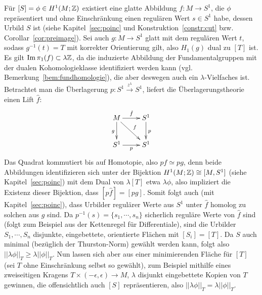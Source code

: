 			Für $[S]=\phi \in H^1(M;\mathbb{Z})$ existiert eine glatte Abbildung $f:M \to S^1$, die $\phi$ repräsentiert und ohne Einschränkung einen regulären Wert $s\in S^1$ habe, dessen Urbild $S$ ist (siehe Kapitel~\ref{sec:poinc} und Konstruktion~\ref{constr:cut} bzw.\,Corollar~\ref{cor:preimage}). Sei auch $g:M \to S^1$ glatt mit dem regulären Wert $t$, sodass $g^{-1}(t)=T$ mit korrekter Orientierung gilt, also $H_1(g)$ dual zu $[T]$ ist. Es gilt $\operatorname{Im}\pi_1(f) \subset \lambda \mathbb{Z}$, da die induzierte Abbildung der Fundamentalgruppen mit der dualen Kohomologieklasse identifiziert werden kann (vgl.\,Bemerkung~\ref{bem:fundhomologie}), die aber deswegen auch ein $\lambda$-Vielfaches ist. Betrachtet man die Überlagerung $p: S^1 \stackrel {z^\lambda} \to  S^1$, liefert die Überlagerungstheorie einen Lift $\hat f$:
            \[
                \begin{xy}
                    \xymatrix{M \ar[r]^{\hat f} \ar[d]_g \ar[dr]^f&S^1 \ar[d]^p \\
                             S^1 \ar[r]_p & S^1}
                \end{xy}
            \]
            Das Quadrat kommutiert bis auf Homotopie, also $p\hat f \simeq p g$, denn beide Abbildungen identifizieren sich unter der Bijektion $H^1(M;\mathbb{Z}) \cong [M,S^1]$ (siehe Kapitel~\ref{sec:poinc}) mit dem Dual von $ \lambda [T]$ etwa $\lambda \phi$, also impliziert die Existenz dieser Bijektion, dass $[p\hat f] = [pg]$. Somit folgt auch (mit Kapitel~\ref{sec:poinc}), dass Urbilder regulärer Werte aus $S^1$ unter $\hat f$ homolog zu solchen aus $g$ sind. Da $p^{-1}(s)=\{s_1,\cdots,s_n\}$ sicherlich reguläre Werte von $\hat f$ sind (folgt zum Beispiel aus der Kettenregel für Differentiale), sind die Urbilder $S_1,\cdots,S_n$ disjunkte, eingebettete, orientierte Flächen mit $[S_i]=[T]$. Da $S$ auch minimal (bezüglich der Thurston-Norm) gewählt werden kann, folgt also $||\lambda \phi||_T \geq \lambda ||\phi||_T $. Nun lassen sich aber aus einer minimierenden Fläche für $[T]$ (sei $T$ ohne Einschränkung selbst so gewählt), zum Beispiel mithilfe eines zweiseitigen Kragens $T \times (-\epsilon,\epsilon) \to M$, $\lambda$ disjunkt eingebettete Kopien von $T$ gewinnen, die offensichtlich auch $[S]$ repräsentieren, also $||\lambda \phi||_T = \lambda ||\phi||_T$. 

